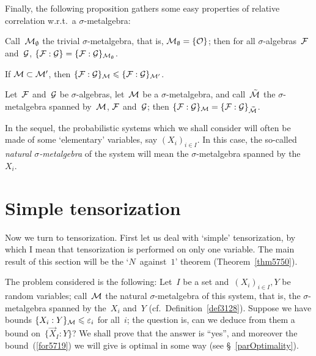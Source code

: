 Finally, the following proposition gathers some easy properties
of relative correlation w.r.t.\ a $\sigma$-metalgebra:
%
\begin{Pro}\strut
\begin{ienumerate}
\item Call~$\mathcal{M}_{\emptyset}$ the trivial $\sigma$-metalgebra, that is,
$\mathcal{M}_{\emptyset} = \{\mathcal{O}\}$; then for all $\sigma$-algebras~$\mathcal{F}$ and~$\mathcal{G}$,
$\{\mathcal{F}:\mathcal{G}\} = \{\mathcal{F}:\mathcal{G}\}_{\mathcal{M}_{\emptyset}}$.
\item If $\mathcal{M} \subset \mathcal{M}'$, then $\{\mathcal{F}:\mathcal{G}\}_{\mathcal{M}} \leqslant \{\mathcal{F}:\mathcal{G}\}_{\mathcal{M}'}$.
\item Let~$\mathcal{F}$ and~$\mathcal{G}$ be $\sigma$-algebras,
let~$\mathcal{M}$ be a $\sigma$-metalgebra, and call~$\tilde{\mcal{M}}$ the $\sigma$-metalgebra
spanned by~$\mathcal{M}$, $\mathcal{F}$ and~$\mathcal{G}$; then
$\{\mcal{F}:\mcal{G}\}_{\mcal{M}} = \{\mcal{F}:\mcal{G}\}_{\tilde{\mcal{M}}}$.
\end{ienumerate}
\end{Pro}

\begin{Def}\label{def3128}
In the sequel, the probabilistic systems which we shall consider
will often be made of some `elementary' variables, say $(X_i)_{i\in I}$.
In this case, the so-called \emph{natural $\sigma$-metalgebra} of the system
will mean the $\sigma$-metalgebra spanned by the~$X_i$.
\end{Def}




\section{Simple tensorization}\label{parSimpleTensorization}

Now we turn to tensorization.
First let us deal with `simple' tensorization,
by which I mean that tensorization is performed on only one variable.
The main result of this section will be the `$N$~against~$1$' theorem
(Theorem~\ref{thm5750}).

The problem considered is the following:
Let~$I$ be a set and~$(X_i)_{i\in I}, Y$ be random variables;
call~$\mathcal{M}$ the natural $\sigma$-metalgebra of this system, that is,
the $\sigma$-metalgebra spanned by the~$X_i$ and~$Y$ (cf.\ Definition~\ref{def3128}).
Suppose we have bounds ${\{X_i:Y\}_{\mathcal{M}}} \leqslant \varepsilon_i$ for all~$i$;
the question is, can we deduce from them a bound on~$\{\vec{X}_I:Y\}$?
We shall prove that the answer is ``yes'',
and moreover the bound~(\ref{for5719}) we will give is optimal in some way
(see \S~\ref{parOptimality}).

